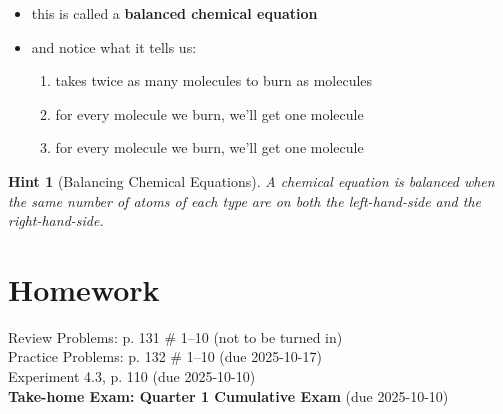 \documentclass[11pt, oneside]{article}   	%
\newtheorem{hint}{Hint}
\begin{document}
\begin{itemize}
\begin{center}
 \end{center}
\item this is called a \textbf{balanced chemical equation}
\item and notice what it tells us:
\begin{enumerate}
\item {} takes twice as many  molecules to burn as  molecules 
\item for every  molecule we burn, we'll get one  molecule
\item for every  molecule we burn, we'll get one  molecule
\end{enumerate}
\end{itemize}

\begin{hint}[Balancing Chemical Equations]
A chemical equation is balanced when the same number of atoms of each type are on both the left-hand-side and the right-hand-side.
\end{hint}

\section{Homework}
Review Problems: p. 131 \# 1--10 (not to be turned in)\\
Practice Problems: p. 132 \# 1--10 (due 2025-10-17)\\
Experiment 4.3, p. 110 (due 2025-10-10)\\
\textbf{Take-home Exam: Quarter 1 Cumulative Exam} (due 2025-10-10) \\



\nocite{wile-chem-2}
{}

\end{document}
